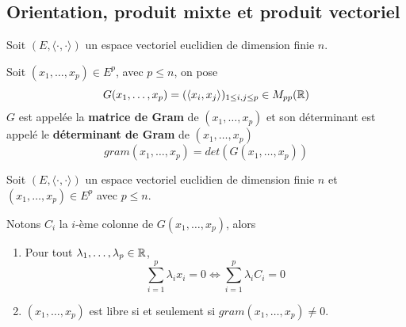 \documentclass[a4paper, 12pt]{article}
\begin{document}
\subsection{Orientation, produit mixte et produit vectoriel}

\begin{definition}
    Soit $(E, \langle \cdot, \cdot \rangle)$ un espace vectoriel euclidien de dimension finie $n$.

    Soit $(x_1, \dots, x_p) \in E^p$, avec $p \leq n$, on pose
    $$
    G(x_1, \dots, x_p) = (\langle x_i, x_j \rangle)_{1 \leq i, j \leq p} \in M_{pp}(\mathbb{R})
    $$
    $G$ est appelée la \textbf{matrice de Gram} de $(x_1, \dots, x_p)$ et son déterminant est appelé le \textbf{déterminant de Gram} de $(x_1, \dots, x_p)$
    $$
    gram(x_1, \dots, x_p) = det(G(x_1, \dots, x_p))
    $$
\end{definition}

\begin{proposition}{}{}
    Soit $(E, \langle \cdot, \cdot \rangle)$ un espace vectoriel euclidien de dimension finie $n$ et $(x_1, \dots, x_p) \in E^p$ avec $p \leq n$.

    Notons $C_i$ la $i$-ème colonne de $G(x_1, \dots, x_p)$, alors

    \begin{enumerate}
        \item Pour tout $\lambda_1, \dots, \lambda_p \in \mathbb{R}$,
        $$
        \sum_{i=1}^p \lambda_i x_i = 0 \iff \sum_{i=1}^p \lambda_i C_i = 0
        $$

        \item
        $(x_1, \dots, x_p)$ est libre si et seulement si $gram(x_1, \dots, x_p) \neq 0$.
    \end{enumerate}
\end{proposition}
\end{document}
